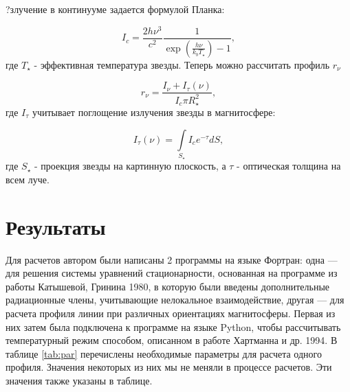 \documentclass{article}
\begin{document}
?злучение в континууме задается формулой Планка:

\begin{equation} \label{eq:profcont}
I_c = \frac{2h\nu^3}{c^2}\frac{1}{\exp\left(\frac{h\nu}{k_bT_\star}\right)-1},
\end{equation}
где $T_\star$ - эффективная температура звезды. Теперь можно рассчитать профиль $r_{\nu}$

\begin{equation} \label{eq:profnorm}
r_{\nu} = \frac{I_\nu + I_{\tau}(\nu)}{I_c \pi R_\star^2},
\end{equation}
где $I_{\tau}$ учитывает поглощение излучения звезды в магнитосфере:

\begin{equation} \label{eq:absorbprof}
I_{\tau}(\nu) = \int \limits_{S_\star} I_c e^{-\tau} dS,
\end{equation}
где $S_\star$ - проекция звезды на картинную плоскость, а $\tau$ - оптическая толщина на всем луче.

\section{Результаты}
Для расчетов автором были написаны 2 программы на языке Фортран: одна --- для решения системы уравнений стационарности, основанная на программе из работы Катышевой, Гринина 1980, в которую были введены дополнительные радиационные члены, учитывающие нелокальное взаимодействие, другая --- для расчета профиля линии при различных ориентациях магнитосферы. Первая из них затем была подключена к программе на языке Python, чтобы рассчитывать температурный режим способом, описанном в работе Хартманна и др. 1994. В таблице \ref{tab:par} перечислены необходимые параметры для расчета одного профиля. Значения некоторых из них мы не меняли в процессе расчетов. Эти значения также указаны в таблице.
\end{document}
